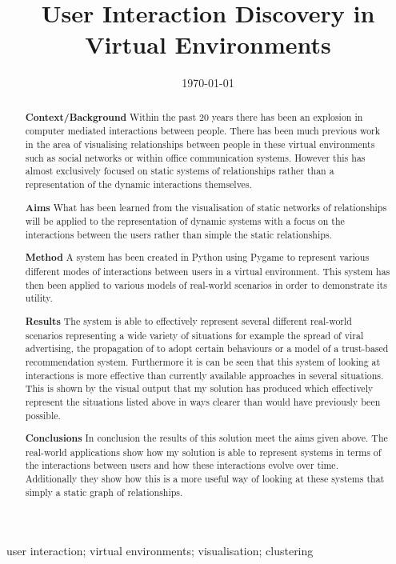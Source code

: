 \documentclass[12pt,a4paper]{article}
\title{User Interaction Discovery in Virtual Environments}
\date{\today}
\begin{document}
\maketitle

\begin{abstract}

{\bf Context/Background}
Within the past 20 years there has been an explosion in computer mediated interactions between people. There has been much previous work in the area of visualising relationships between people in these virtual environments such as social networks or within office communication systems. However this has almost exclusively focused on static systems of relationships rather than a representation of the dynamic interactions themselves.

{\bf Aims}
What has been learned from the visualisation of static networks of relationships will be applied to the representation of dynamic systems with a focus on the interactions between the users rather than simple the static relationships.

{\bf Method}
A system has been created in Python using Pygame to represent various different modes of interactions between users in a virtual environment. This system has then been applied to various models of real-world scenarios in order to demonstrate its utility.

{\bf Results}
The system is able to effectively represent several different real-world scenarios representing a wide variety of situations for example the spread of viral advertising, the propagation of to adopt certain behaviours or a model of a trust-based recommendation system. Furthermore it is can be seen that this system of looking at interactions is more effective than currently available approaches in several situations. This is shown by the visual output that my solution has produced which effectively represent the situations listed above in ways clearer than would have previously been possible.

{\bf Conclusions}
In conclusion the results of this solution meet the aims given above. The real-world applications show how my solution is able to represent systems in terms of the interactions between users and how these interactions evolve over time. Additionally they show how this is a more useful way of looking at these systems that simply a static graph of relationships.

\end{abstract}

\begin{keywords}
user interaction; virtual environments; visualisation; clustering
\end{keywords}
\end{document}
